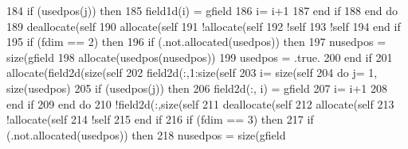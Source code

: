 \begin{DoxyCode}
184                 \textcolor{keywordflow}{if} (usedpos(j)) \textcolor{keywordflow}{then}
185                     field1d(i) = gfield%
186                     i= i+1
187 \textcolor{keywordflow}{                end if}
188 \textcolor{keywordflow}{            end do}
189             \textcolor{keyword}{deallocate}(self%
190             \textcolor{keyword}{allocate}(self%
191             \textcolor{comment}{!allocate(self%
192             \textcolor{comment}{!self%
193             \textcolor{comment}{!self%
194 \textcolor{keywordflow}{        end if}
195         \textcolor{keywordflow}{if} (fdim == 2) \textcolor{keywordflow}{then}
196             \textcolor{keywordflow}{if} (.not.\textcolor{keyword}{allocated}(usedpos)) \textcolor{keywordflow}{then}
197                 nusedpos = \textcolor{keyword}{size}(gfield%
198                 \textcolor{keyword}{allocate}(usedpos(nusedpos))
199                 usedpos = .true.
200 \textcolor{keywordflow}{            end if}
201             \textcolor{keyword}{allocate}(field2d(\textcolor{keyword}{size}(self%
202             field2d(:,1:\textcolor{keyword}{size}(self%
203             i= \textcolor{keyword}{size}(self%
204             \textcolor{keywordflow}{do} j= 1, \textcolor{keyword}{size}(usedpos)
205                 \textcolor{keywordflow}{if} (usedpos(j)) \textcolor{keywordflow}{then}
206                     field2d(:, i) = gfield%
207                     i= i+1
208 \textcolor{keywordflow}{                end if}
209 \textcolor{keywordflow}{            end do}
210             \textcolor{comment}{!field2d(:,size(self%
211             \textcolor{keyword}{deallocate}(self%
212             \textcolor{keyword}{allocate}(self%
213             \textcolor{comment}{!allocate(self%
214             \textcolor{comment}{!self%
215 \textcolor{keywordflow}{        end if}
216         \textcolor{keywordflow}{if} (fdim == 3) \textcolor{keywordflow}{then}
217             \textcolor{keywordflow}{if} (.not.\textcolor{keyword}{allocated}(usedpos)) \textcolor{keywordflow}{then}
218                 nusedpos = \textcolor{keyword}{size}(gfield%
}}}}}}
\end{DoxyCode}
